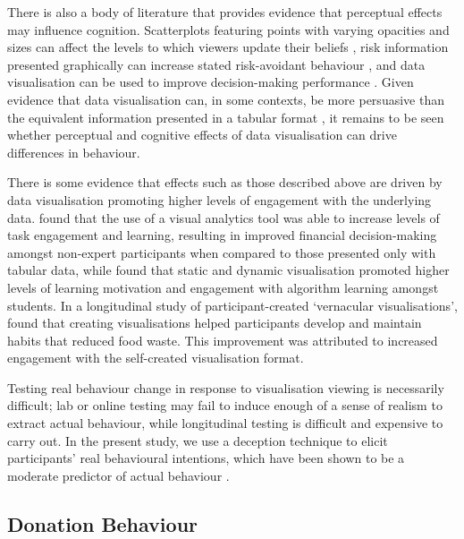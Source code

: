 \documentclass[
  authoryear,
  preprint,
  3p]{elsarticle}
\begin{document}
There is also a body of literature that provides evidence that
perceptual effects may influence cognition. Scatterplots featuring
points with varying opacities and sizes can affect the levels to which
viewers update their beliefs \citep{strain_2025}, risk information
presented graphically can increase stated risk-avoidant behaviour
\citep{stone_1997, schirillo_2005}, and data visualisation can be used
to improve decision-making performance
\citep{cheong_2016, padilla_2018}. Given evidence that data
visualisation can, in some contexts, be more persuasive than the
equivalent information presented in a tabular format
\citep{pandey_2014}, it remains to be seen whether perceptual and
cognitive effects of data visualisation can drive differences in
behaviour.

There is some evidence that effects such as those described above are
driven by data visualisation promoting higher levels of engagement with
the underlying data. \citet{rudolph_2009} found that the use of a visual
analytics tool was able to increase levels of task engagement and
learning, resulting in improved financial decision-making amongst
non-expert participants when compared to those presented only with
tabular data, while \citet{fu_2025} found that static and dynamic
visualisation promoted higher levels of learning motivation and
engagement with algorithm learning amongst students. In a longitudinal
study of participant-created `vernacular visualisations',
\citet{abos_2024} found that creating visualisations helped participants
develop and maintain habits that reduced food waste. This improvement
was attributed to increased engagement with the self-created
visualisation format.

Testing real behaviour change in response to visualisation viewing is
necessarily difficult; lab or online testing may fail to induce enough
of a sense of realism to extract actual behaviour, while longitudinal
testing is difficult and expensive to carry out. In the present study,
we use a deception technique to elicit participants' real behavioural
intentions, which have been shown to be a moderate predictor of actual
behaviour \citep{webb_2006, conner_2022}.

\subsection{Donation Behaviour}\label{sec-donation-behaviour}
\end{document}

